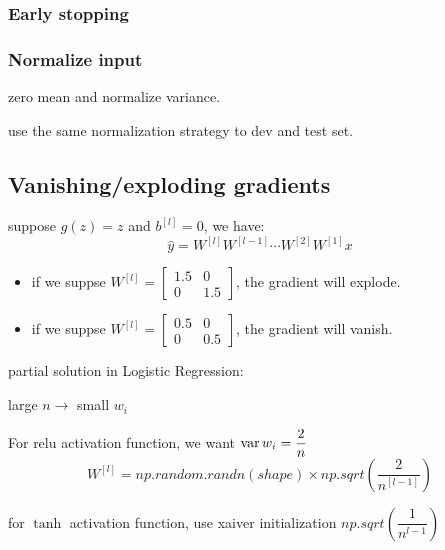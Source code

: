 \subsubsection{Early stopping}

\subsubsection{Normalize input}
zero mean and normalize variance.

use the same normalization strategy to dev and test set.

\subsection{Vanishing/exploding gradients}
suppose $g(z) = z$ and $b^{[l]} = 0$, we have:
$$\hat{y} = W^{[l]} W^{[l - 1]} \cdots W^{[2]} W^{[1]} x$$
\begin{itemize}
\item if we suppse $W^{[l]} = \begin{bmatrix}1.5 & 0 \\ 0 & 1.5\end{bmatrix}$, the gradient will explode.
\item if we suppse $W^{[l]} = \begin{bmatrix}0.5 & 0 \\ 0 & 0.5\end{bmatrix}$, the gradient will vanish.
\end{itemize}

partial solution in Logistic Regression:

large $n \longrightarrow$ small $w_i$

For relu activation function, we want $\operatorname{var}{w_i} = \dfrac{2}{n}$
$$W^{[l]} = np.random.randn(shape) \times np.sqrt(\dfrac{2}{n^{[l - 1]}})$$

for $\tanh$ activation function, use xaiver initialization $np.sqrt(\dfrac{1}{n^{l - 1}})$

